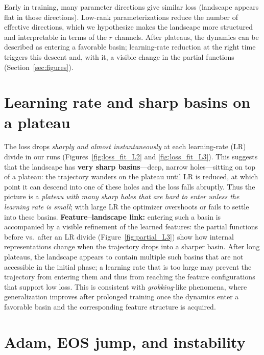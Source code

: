 \documentclass{article}
\begin{document}
Early in training, many parameter directions give similar loss (landscape appears flat in those directions). Low-rank parameterizations reduce the number of effective directions, which we hypothesize makes the landscape more structured and interpretable in terms of the $r$ channels. After plateaus, the dynamics can be described as entering a favorable basin; learning-rate reduction at the right time triggers this descent and, with it, a visible change in the partial functions (Section~\ref{sec:figures}).

\section{Learning rate and sharp basins on a plateau}
\label{sec:lr}

The loss drops \emph{sharply and almost instantaneously} at each learning-rate (LR) divide in our runs (Figures~\ref{fig:loss_fit_L2} and \ref{fig:loss_fit_L3}). This suggests that the landscape has \textbf{very sharp basins}---deep, narrow holes---sitting on top of a plateau: the trajectory wanders on the plateau until LR is reduced, at which point it can descend into one of these holes and the loss falls abruptly. Thus the picture is a \emph{plateau with many sharp holes that are hard to enter unless the learning rate is small}; with large LR the optimizer overshoots or fails to settle into these basins. \textbf{Feature--landscape link:} entering such a basin is accompanied by a visible refinement of the learned features: the partial functions before vs.\ after an LR divide (Figure~\ref{fig:partial_L3}) show how internal representations change when the trajectory drops into a sharper basin. After long plateaus, the landscape appears to contain multiple such basins that are not accessible in the initial phase; a learning rate that is too large may prevent the trajectory from entering them and thus from reaching the feature configurations that support low loss. This is consistent with \emph{grokking}-like phenomena, where generalization improves after prolonged training once the dynamics enter a favorable basin and the corresponding feature structure is acquired.

\section{Adam, EOS jump, and instability}
\label{sec:adam}
\end{document}
